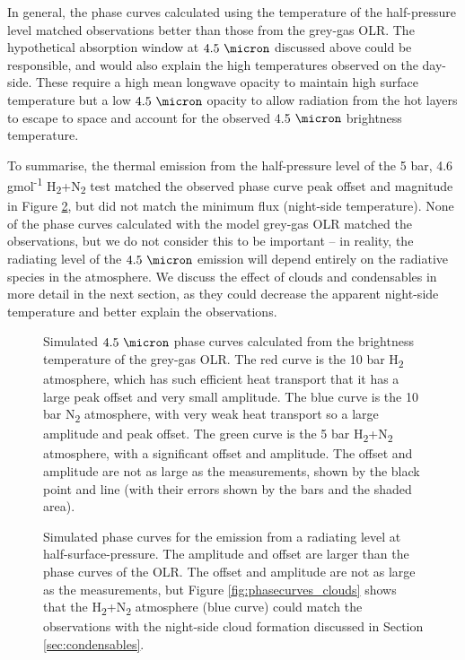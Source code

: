 In general, the phase curves calculated using the temperature of the half-pressure level matched observations better than those from the grey-gas OLR. The hypothetical absorption window at $4.5\ \micron$ discussed above could be responsible, and would also explain the high temperatures observed on the day-side. These require a high mean longwave opacity to maintain high surface temperature but a low $4.5\ \micron$ opacity to allow radiation from the hot layers to escape to space and account for the observed 4.5 $\micron$ brightness temperature.


To summarise, the thermal emission from the half-pressure level of the 5 bar, 4.6 gmol\textsuperscript{-1} H\textsubscript{2}+N\textsubscript{2} test matched the observed phase curve peak offset and magnitude in Figure \ref{fig:phasecurves_temp}, but did not match the minimum flux (night-side temperature). None of the phase curves calculated with the model grey-gas OLR matched the observations, but we do not consider this to be important -- in reality, the radiating level of the $4.5\ \micron$ emission will depend entirely on the radiative species in the atmosphere. We discuss the effect of clouds and condensables in more detail in the next section, as they could decrease the apparent night-side temperature and better explain the observations.

\begin{figure}
\caption{Simulated $4.5\ \micron$ phase curves calculated from the brightness temperature of the grey-gas OLR. The red curve is the 10 bar H\textsubscript{2} atmosphere, which has such efficient heat transport that it has a large peak offset and very small amplitude. The blue curve is the 10 bar N\textsubscript{2} atmosphere, with very weak heat transport so a large amplitude and peak offset. The green curve is the 5 bar H\textsubscript{2}+N\textsubscript{2} atmosphere, with a significant offset and amplitude. The offset and amplitude are not as large as the \citet{demory2016map} measurements, shown by the black point and line (with their errors shown by the bars and the shaded area).\label{fig:phasecurves_flux}}
\end{figure}

\begin{figure}
\caption{Simulated phase curves for the emission from a radiating level at half-surface-pressure. The amplitude and offset are larger than the phase curves of the OLR. The offset and amplitude are not as large as the \citet{demory2016map} measurements, but Figure \ref{fig:phasecurves_clouds} shows that the H\textsubscript{2}+N\textsubscript{2} atmosphere (blue curve) could match the observations with the night-side cloud formation discussed in Section \ref{sec:condensables}.\label{fig:phasecurves_temp}}
\end{figure}


